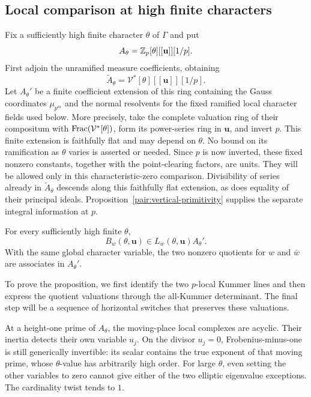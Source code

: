 \subsection{Local comparison at high finite characters}

Fix a sufficiently high finite character \(\theta\) of \(\Gamma\)
and put
\[
 A_\theta=\mathbb Z_p[\theta][[\mathbf u]][1/p].
\]
First adjoin the unramified measure coefficients, obtaining
\[
 \widetilde A_\theta=\mathcal V^*[\theta][[\mathbf u]][1/p].
\]
Let \(A_\theta'\) be a finite coefficient extension of this ring
containing the Gauss coordinates \(\mu_{p^m}\) and the normal
resolvents for the fixed ramified local character fields used below.
More precisely, take the complete valuation ring of their
compositum with \(\operatorname{Frac}(\mathcal V^*[\theta])\), form its power-series
ring in \(\mathbf u\), and invert \(p\).
This finite extension is faithfully flat and may depend on
\(\theta\).  No bound on its ramification as \(\theta\) varies is
asserted or needed.
Since \(p\) is now inverted, these fixed nonzero constants, together
with the point-clearing factors, are units.  They will be allowed
only in this characteristic-zero comparison.  Divisibility of
series already in \(\widetilde A_\theta\) descends along this
faithfully flat extension, as does equality of their principal
ideals.  Proposition~\ref{pair:vertical-primitivity} supplies the
separate integral information at \(p\).

\begin{proposition}
\label{pair:finite-divisibility}
For every sufficiently high finite \(\theta\),
\begin{equation}
 B_w(\theta,\mathbf u)\in
         L_w(\theta,\mathbf u)A_\theta'.
 \tag{15}\label{eq:source-15}
\end{equation}
With the same global character variable, the two nonzero quotients
for \(w\) and \(\bar w\) are associates in \(A_\theta'\).
\end{proposition}

To prove the proposition, we first identify the two \(p\)-local
Kummer lines and then express the quotient valuations through the
all-Kummer determinant.  The final step will be a sequence of
horizontal switches that preserves these valuations.

At a height-one prime of \(A_\theta\), the moving-place local
complexes are acyclic.  Their inertia detects their own variable
\(u_j\).  On the divisor \(u_j=0\), Frobenius-minus-one is still
generically invertible: its scalar contains the true exponent of
that moving prime, whose \(\theta\)-value has arbitrarily high
order.  For large \(\theta\), even setting the other variables to
zero cannot give either of the two elliptic eigenvalue exceptions.
The cardinality twist tends to \(1\).

